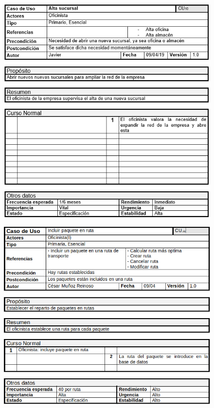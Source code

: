 \begin{figure}[H]
	\centering
	\includegraphics[width=16cm]{10}
\end{figure}
\begin{figure}[H]
	\centering
	\includegraphics[width=16cm]{11}
\end{figure}
